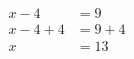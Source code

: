 \documentclass[varwidth]{standalone}
\begin{document}
    \begin{varwidth}{0.25\paperwidth}
    \begin{align*}
    x - 4 &= 9\\
    x - 4 + 4 &= 9 + 4\\
    x &= 13\\
\end{align*}
\end{varwidth}
\end{document}
